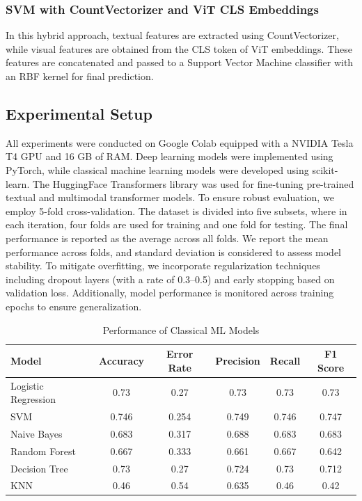 \documentclass[11pt]{article}
\begin{document}
\subsubsection{SVM with CountVectorizer and ViT CLS Embeddings} 
In this hybrid approach, textual features are extracted using CountVectorizer, while visual features are obtained from the CLS token of ViT embeddings. These features are concatenated and passed to a Support Vector Machine classifier with an RBF kernel for final prediction.

\subsection{Experimental Setup}

All experiments were conducted on Google Colab equipped with a NVIDIA Tesla T4 GPU and 16 GB of RAM. Deep learning models were implemented using PyTorch, while classical machine learning models were developed using scikit-learn. The HuggingFace Transformers library was used for fine-tuning pre-trained textual and multimodal transformer models. To ensure robust evaluation, we employ 5-fold cross-validation. The dataset is divided into five subsets, where in each iteration, four folds are used for training and one fold for testing. The final performance is reported as the average across all folds. We report the mean performance across folds, and standard deviation is considered to assess model stability. To mitigate overfitting, we incorporate regularization techniques including dropout layers (with a rate of 0.3–0.5) and early stopping based on validation loss. Additionally, model performance is monitored across training epochs to ensure generalization.


\begin{table}[h]
\footnotesize
\centering
\caption{Performance of Classical ML Models}
\begin{tabular}{|l|c|c|c|c|c|}
\hline
\textbf{Model} & \textbf{Accuracy} & \textbf{Error Rate} & \textbf{Precision} & \textbf{Recall} & \textbf{F1 Score} \\
\hline
Logistic Regression & 0.73 & 0.27 & 0.73 & 0.73 & 0.73 \\
SVM & 0.746 & 0.254 & 0.749 & 0.746 & 0.747 \\
Naive Bayes & 0.683 & 0.317 & 0.688 & 0.683 & 0.683 \\
Random Forest & 0.667 & 0.333 & 0.661 & 0.667 & 0.642 \\
Decision Tree & 0.73 & 0.27 & 0.724 & 0.73 & 0.712 \\
KNN & 0.46 & 0.54 & 0.635 & 0.46 & 0.42 \\
\hline
\end{tabular}
\label{tab:ml_models}
\end{table}
\end{document}
